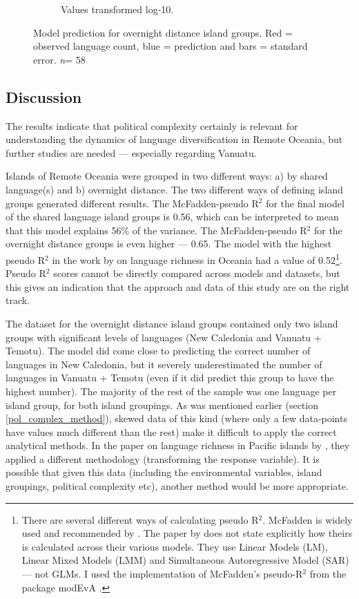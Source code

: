 \documentclass[a4paper,10pt]{article} %
\begin{document}
\begin{figure}
\begin{subfigure}{12cm}
\caption{Values transformed log-10.}
    \end{subfigure}
\caption[Model prediction for overnight distance island groups.]{{Model prediction for overnight distance island groups. Red = observed language count, blue = prediction and bars = standard error. \emph{n}= 58}}
\label{Marck_model_predict}
\end{figure}


\subsection{Discussion}
\label{pol_study_discisson}
The results indicate that political complexity certainly is relevant for understanding the dynamics of language diversification in Remote Oceania, but further studies are needed --- especially regarding Vanuatu.

Islands of Remote Oceania were grouped in two different ways: a) by shared language(s) and b) overnight distance. The two different ways of defining island groups generated different results. The McFadden-pseudo R$^2$ \citep{mcfadden1974frontiers} for the final model of the shared language island groups is 0.56, which can be interpreted to mean that this model explains 56\% of the variance. The McFadden-pseudo R$^2$ for the overnight distance groups is even higher ---  0.65. The model with the highest pseudo R$^2$ in the work by \citet{gavin2012island} on language richness in Oceania had a value of 0.52\footnote{There are several different ways of calculating pseudo R$^2$. McFadden is widely used and recommended by \citet{allison2014measures}. The paper by \citet{gavin2012island} does not state explicitly how theirs is calculated across their various models. They use Linear Models (LM), Linear Mixed Models (LMM) and Simultaneous Autoregressive Model (SAR) --- not GLMs. I used the implementation of McFadden's pseudo-R$^2$ from the package modEvA \citep{barbosa2016package}.}. Pseudo R$^2$ scores cannot be directly compared across models and datasets, but this gives an indication that the approach and data of this study are on the right track.

The dataset for the overnight distance island groups contained only two island groups with significant levels of languages (New Caledonia and Vanuatu + Temotu). The model did come close to predicting the correct number of languages in New Caledonia, but it severely underestimated the number of languages in Vanuatu + Temotu (even if it did predict this group to have the highest number). The majority of the rest of the sample was one language per island group, for both island groupings. As was mentioned earlier (section \ref{pol_complex_method}), skewed data of this kind (where only a few data-points have values much different than the rest) make it difficult to apply the correct analytical methods. In the paper on language richness in Pacific islands by \cite{gavin2012island}, they applied a different methodology (transforming the response variable). It is possible that given this data (including the environmental variables, island groupings, political complexity etc), another method would be more appropriate.
\end{document}
